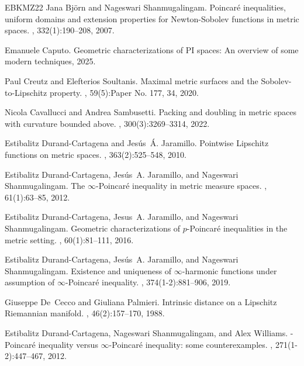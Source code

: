\documentclass[reqno]{amsart}
\numberwithin{equation}{section}
\theoremstyle{remark}
\begin{document}
\begin{thebibliography}{EBKMZ22}
Jana Bj\"{o}rn and Nageswari Shanmugalingam.
\newblock Poincar\'{e} inequalities, uniform domains and extension properties
  for {N}ewton-{S}obolev functions in metric spaces.
, 332(1):190--208, 2007.

Emanuele Caputo.
\newblock Geometric characterizations of {PI} spaces: An overview of some
  modern techniques, 2025.

Paul Creutz and Elefterios Soultanis.
\newblock Maximal metric surfaces and the {S}obolev-to-{L}ipschitz property.
, 59(5):Paper No. 177,
  34, 2020.

Nicola Cavallucci and Andrea Sambusetti.
\newblock Packing and doubling in metric spaces with curvature bounded above.
, 300(3):3269--3314, 2022.

Estibalitz Durand-Cartagena and Jesús~Á. Jaramillo.
\newblock Pointwise {L}ipschitz functions on metric spaces.
, 363(2):525--548, 2010.

Estibalitz Durand-Cartagena, Jes\'{u}s~A. Jaramillo, and Nageswari
  Shanmugalingam.
\newblock The {$\infty$}-{P}oincar\'{e} inequality in metric measure spaces.
, 61(1):63--85, 2012.

Estibalitz Durand-Cartagena, Jesus~A. Jaramillo, and Nageswari Shanmugalingam.
\newblock Geometric characterizations of {$p$}-{P}oincar\'{e} inequalities in
  the metric setting.
, 60(1):81--111, 2016.

Estibalitz Durand-Cartagena, Jes\'us~A. Jaramillo, and Nageswari
  Shanmugalingam.
\newblock Existence and uniqueness of {$\infty$}-harmonic functions under
  assumption of {$\infty$}-{P}oincar\'e{} inequality.
, 374(1-2):881--906, 2019.

Giuseppe De~Cecco and Giuliana Palmieri.
\newblock Intrinsic distance on a {L}ipschitz {R}iemannian manifold.
, 46(2):157--170, 1988.

Estibalitz Durand-Cartagena, Nageswari Shanmugalingam, and Alex Williams.
-{P}oincar\'{e} inequality versus {$\infty$}-{P}oincar\'{e}
  inequality: some counterexamples.
, 271(1-2):447--467, 2012.


\end{thebibliography}
\end{document}
